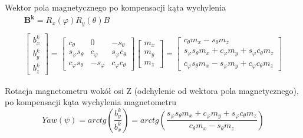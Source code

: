 Wektor pola magnetycznego po kompensacji kąta wychylenia
\begin{equation}
    \begin{array}{c}
        \mathbf{B^{k}} = R_x(\varphi)R_y(\theta)B 
        \\ \\
        \left[
            \begin{array}{c}
                b^k_x \\
                b^k_y \\
                b^k_z
            \end{array}
        \right]
        =
        \left[
            \begin{array}{ccc}
                c_{\theta} & 0 & -s_{\theta} \\
                s_{\varphi}s_{\theta} & c_{\varphi} & s_{\varphi}c_{\theta} \\
                c_{\varphi}s_{\theta} & -s_{\varphi} & c_{\varphi}c_{\theta}
            \end{array}
        \right]
        \left[
            \begin{array}{c}
                m_x \\
                m_y \\
                m_z
            \end{array}
        \right]
        =
        \left[
            \begin{array}{c}
                c_{\theta}m_x - s_{\theta}m_z \\
                s_{\varphi}s_{\theta}m_x + c_{\varphi}m_y + s_{\varphi}c_{\theta}m_z \\
                c_{\varphi}s_{\theta}m_x - s_{\varphi}m_y + c_{\varphi}c_{\theta}m_z
            \end{array}
        \right]
    \end{array}
\end{equation}

Rotacja magnetometru wokół osi Z (odchylenie od wektora pola magnetycznego), po kompensacji kąta wychylenia magnetometru
\begin{equation}
    Yaw(\psi) = arctg\left(\frac{b^k_y}{b^k_x}\right) = arctg\left(\frac{s_{\varphi}s_{\theta}m_x + c_{\varphi}m_y + s_{\varphi}c_{\theta}m_z}{c_{\theta}m_x - s_{\theta}m_z}\right)
    \label{Odchylenie po kompensacji}
\end{equation}

